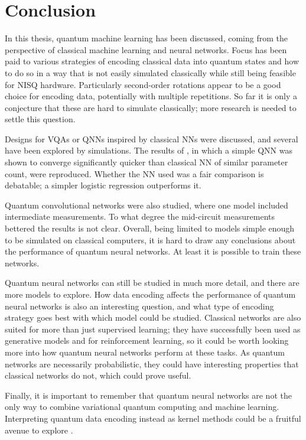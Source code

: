 \chapter{Conclusion}
\label{chap:conclusion}
In this thesis, quantum machine learning has been discussed, coming from the perspective of classical machine learning and neural networks.
Focus has been paid to various strategies of encoding classical data into quantum states and how to do so in a way that is not easily simulated classically while still being feasible for NISQ hardware.
Particularly second-order rotations appear to be a good choice for encoding data, potentially with multiple repetitions.
So far it is only a conjecture that these are hard to simulate classically; more research is needed to settle this question.

Designs for VQAs or QNNs inspired by classical NNs were discussed, and several have been explored by simulations.
The results of \cite{abbas2021}, in which a simple QNN was shown to converge significantly quicker than classical NN of similar parameter count, were reproduced.
Whether the NN used was a fair comparison is debatable; a simpler logistic regression outperforms it.

Quantum convolutional networks were also studied, where one model included intermediate measurements.
To what degree the mid-circuit measurements bettered the results is not clear.
Overall, being limited to models simple enough to be simulated on classical computers, it is hard to draw any conclusions about the performance of quantum neural networks.
At least it is possible to train these networks.

Quantum neural networks can still be studied in much more detail, and there are more models to explore.
How data encoding affects the performance of quantum neural networks is also an interesting question, and what type of encoding strategy goes best with which model could be studied.
Classical networks are also suited for more than just supervised learning; they have successfully been used as generative models and for reinforcement learning, so it could be worth looking more into how quantum neural networks perform at these tasks.
As quantum networks are necessarily probabilistic, they could have interesting properties that classical networks do not, which could prove useful.

Finally, it is important to remember that quantum neural networks are not the only way to combine variational quantum computing and machine learning.
Interpreting quantum data encoding instead as kernel methods could be a fruitful avenue to explore \cite{schuld2019a}.